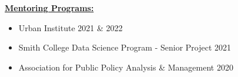 \documentclass[11pt, letterpaper, roman]{moderncv} %
\begin{document}
\vspace{6pt}
\underline{\textbf{\large Mentoring Programs:}}\normalsize

    \begin{itemize}
        \item Urban Institute \hfill 2021 \& 2022
        \item Smith College Data Science Program - Senior Project \hfill 2021
        \item Association for Public Policy Analysis \& Management \hfill 2020
    \end{itemize}

\end{document}
